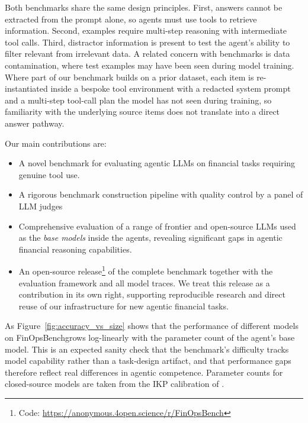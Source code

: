 \documentclass[11pt]{article}
\newcommand{\editN}[1]{\textcolor{editgreen}{#1}}
\newcommand{\datasetname}{FinOpsBench}\xspace
\begin{document}
Both benchmarks share the same design principles. First, answers cannot be extracted from the prompt alone, so agents must use tools to retrieve information. Second, examples require multi-step reasoning with intermediate tool calls. Third, distractor information is present to test the agent's ability to filter relevant from irrelevant data. \editN{A related concern with benchmarks is data contamination, where test examples may have been seen during model training. Where part of our benchmark builds on a prior dataset, each item is re-instantiated inside a bespoke tool environment with a redacted system prompt and a multi-step tool-call plan the model has not seen during training, so familiarity with the underlying source items does not translate into a direct answer pathway.}

Our main contributions are:
\begin{itemize}
    \item A novel benchmark for evaluating agentic LLMs on financial tasks requiring genuine tool use.
    \item A rigorous benchmark construction pipeline with 
    \editN{quality control by a panel of LLM judges}
    \item Comprehensive evaluation of a range of frontier and open-source LLMs used as the \emph{base models} inside the agents,
    revealing significant gaps in agentic financial reasoning capabilities.
    \item \editN{An open-source release\footnote{Code: \url{https://anonymous.4open.science/r/FinOpsBench}} of the complete benchmark together with the evaluation framework and all model traces. We treat this release as a contribution in its own right, supporting reproducible research and direct reuse of our infrastructure for new agentic financial tasks.}
\end{itemize}

As Figure~\ref{fig:accuracy_vs_size} shows that the performance of different models on \datasetname grows log-linearly with the parameter count of the agent's base model. This is an expected sanity check that the benchmark's difficulty tracks model capability rather than a task-design artifact, and that performance gaps therefore reflect real differences in agentic competence. Parameter counts for closed-source models are taken from the IKP calibration of \citet{li2026incompressible}.
\end{document}
